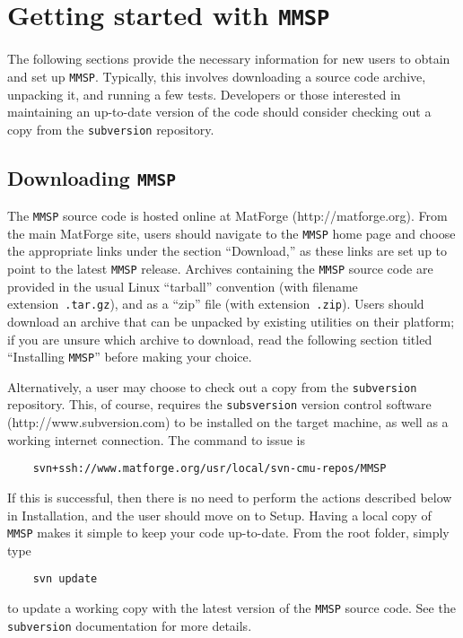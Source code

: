 
\chapter{Getting started with {\tt MMSP}}
The following sections provide the necessary information for new users to obtain and set up {\tt MMSP}.  Typically, this involves downloading a source code archive, unpacking it, and running a few tests.  Developers or those interested in maintaining an up-to-date version of the code should consider checking out a copy from the {\tt subversion} repository.

\section{Downloading {\tt MMSP}}
The {\tt MMSP} source code is hosted online at MatForge (http://matforge.org).  From the main MatForge site, users should navigate to the {\tt MMSP} home page and choose the appropriate links under the section ``Download,''  as these links are set up to point to the latest {\tt MMSP} release.  Archives containing the {\tt MMSP} source code are provided in the usual Linux ``tarball'' convention (with filename extension~{\tt .tar.gz}), and as a ``zip'' file (with extension~{\tt .zip}).  Users should download an archive that can be unpacked by existing utilities on their platform; if you are unsure which archive to download, read the following section titled ``Installing {\tt MMSP}'' before making your choice.

Alternatively, a user may choose to check out a copy from the {\tt subversion} repository.  This, of course, requires the {\tt subsversion} version control software (http://www.subversion.com) to be installed on the target machine, as well as a working internet connection.  The command to issue is
\begin{shadebox}
\begin{verbatim}
    svn+ssh://www.matforge.org/usr/local/svn-cmu-repos/MMSP
\end{verbatim}
\end{shadebox}
If this is successful, then there is no need to perform the actions described below in Installation, and the user should move on to Setup.  Having a local copy of {\tt MMSP} makes it simple to keep your code up-to-date.  From the root folder, simply type
\begin{shadebox}
\begin{verbatim}
    svn update
\end{verbatim}
\end{shadebox}
to update a working copy with the latest version of the {\tt MMSP} source code.  See the {\tt subversion} documentation for more details.

